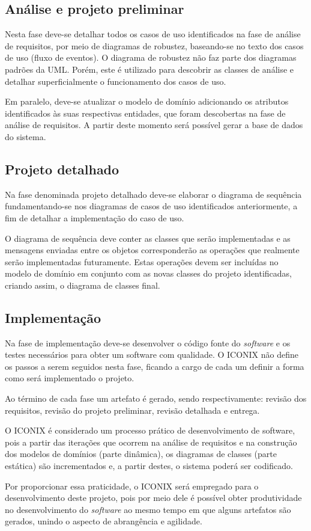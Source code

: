 \subsection{Análise e projeto preliminar}

Nesta fase deve-se detalhar todos os casos de uso identificados na fase de análise de requisitos, por meio de diagramas de robustez, baseando-se no texto dos casos de uso (fluxo de eventos). O diagrama de robustez não faz parte dos diagramas padrões da UML. Porém, este é utilizado para descobrir as classes de análise e detalhar superficialmente o funcionamento dos casos de uso.

Em paralelo, deve-se atualizar o modelo de domínio adicionando os atributos identificados às suas respectivas entidades, que foram descobertas na fase de análise de requisitos. A partir deste momento será possível gerar a base de dados do sistema.


\subsection{Projeto detalhado}

\par Na fase denominada projeto detalhado deve-se elaborar o diagrama de sequência fundamentando-se nos diagramas de casos de uso identificados anteriormente, a fim de detalhar a implementação do caso de uso.

O diagrama de sequência deve conter as classes que serão implementadas e as mensagens enviadas entre os objetos corresponderão as operações que realmente serão implementadas futuramente. Estas operações devem ser incluídas no modelo de domínio em conjunto com as novas classes do projeto identificadas, criando assim, o diagrama de classes final.

\subsection{Implementação}

Na fase de implementação deve-se desenvolver o código fonte do \textit{software} e os testes necessários para obter um software com qualidade. O ICONIX não define os passos a serem seguidos nesta fase, ficando a cargo de cada um definir a forma como será implementado o projeto.
 
Ao término de cada fase um artefato é gerado, sendo respectivamente: revisão dos requisitos, revisão do projeto preliminar, revisão detalhada e entrega.

O ICONIX é considerado um processo prático de desenvolvimento de software, pois a partir das iterações que ocorrem na análise de requisitos e na construção dos modelos de domínios (parte dinâmica), os diagramas de classes (parte estática) são incrementados e, a partir destes, o sistema poderá ser codificado.


Por proporcionar essa praticidade, o ICONIX será empregado para o desenvolvimento deste projeto, pois por meio dele é possível obter produtividade no desenvolvimento do \textit{software} ao mesmo tempo em que alguns artefatos são gerados, unindo o aspecto de abrangência e agilidade.
